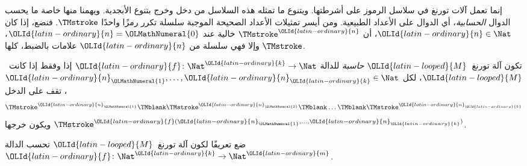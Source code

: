 \documentclass[../../../include/open-logic-section]{subfiles}
\begin{document}

\begin{explain}
إنما تعمل آلات تورنغ في سلاسل الرموز على أشرطتها. ويتنوع ما تمثله هذه السلاسل من دخل وخرج بتنوع الأبجدية. ويهمنا منها خاصة ما يحسب الدوال \emph{الحسابية}، أي الدوال على الأعداد الطبيعية. ومن أيسر تمثيلات الأعداد الصحيحة الموجبة سلسلة تكرر رمزًا واحدًا $\TMstroke$. فنضع، إذا كان ${\OLId{latin-ordinary}{n}} \in \Nat$، أن $\TMstroke^{\OLId{latin-ordinary}{n}}$ خالية عند ${\OLId{latin-ordinary}{n}}={\OLMathNumeral{0}}$، وإلا فهي سلسلة من ${\OLId{latin-ordinary}{n}}$ علامات بالضبط، كلها $\TMstroke$.
\end{explain}

\begin{defn}[الحساب]
تكون آلة تورنغ~${\OLId{latin-looped}{M}}$ \emph{حاسبة} للدالة ${\OLId{latin-ordinary}{f}}\colon\Nat^{\OLId{latin-ordinary}{k}}\to\Nat$ إذا وفقط إذا كانت~${\OLId{latin-looped}{M}}$، لكل ${\OLId{latin-ordinary}{n}}_{\OLMathNumeral{1}},\dots,{\OLId{latin-ordinary}{n}}_{\OLId{latin-ordinary}{k}}\in\Nat$، تقف على الدخل
\[
\TMstroke^{{\OLId{latin-ordinary}{n}}_{\OLMathNumeral{1}}} \TMblank \TMstroke^{{\OLId{latin-ordinary}{n}}_{\OLMathNumeral{2}}} \TMblank \dots \TMblank \TMstroke^{{\OLId{latin-ordinary}{n}}_{\OLId{latin-ordinary}{k}}}
\]
ويكون خرجها $\TMstroke^{{\OLId{latin-ordinary}{f}}({\OLId{latin-ordinary}{n}}_{\OLMathNumeral{1}},\dots,{\OLId{latin-ordinary}{n}}_{\OLId{latin-ordinary}{k}})}$.
\end{defn}

\begin{prob}
ضع تعريفًا لكون آلة تورنغ~${\OLId{latin-looped}{M}}$ تحسب الدالة ${\OLId{latin-ordinary}{f}}\colon\Nat^{\OLId{latin-ordinary}{k}}\to\Nat^{\OLId{latin-ordinary}{m}}$.
\end{prob}
\end{document}

